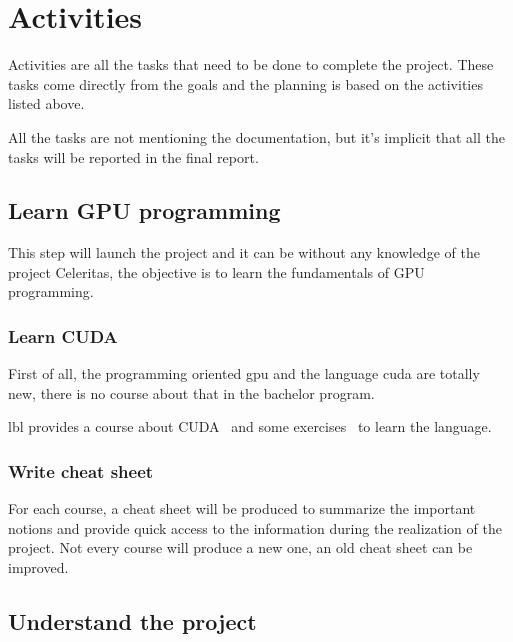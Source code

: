 \chapter{Activities}
\label{spec:ch:activities}

Activities are all the tasks that need to be done to complete the project.
These tasks come directly from the goals and the planning is based on the activities listed above.

All the tasks are not mentioning the documentation, but it's implicit that all the tasks will be reported in the final report.

\section{Learn GPU programming}
\label{spec:ch:activities:learn-gpu-programming}

This step will launch the project and it can be without any knowledge of the project Celeritas, the objective is to learn the fundamentals of GPU programming.


\subsection{Learn CUDA}
\label{spec:ch:activities:learn-gpu-programming:learn-cuda}

First of all, the programming oriented \acrshort{gpu} and the language \acrshort{cuda} are totally new, there is no course about that in the bachelor program.

\acrlong{lbl} provides a course about CUDA~\cite{cuda-training} and some exercises~\cite{cuda-series} to learn the language.


\subsection{Write cheat sheet}
\label{spec:spec:ch:activities:learn-gpu-programming:write-cheat-sheet}

For each course, a cheat sheet will be produced to summarize the important notions and provide quick access to the information during the realization of the project.
Not every course will produce a new one, an old cheat sheet can be improved.


\section{Understand the project}
\label{spec:ch:activities:understand-the-project}

